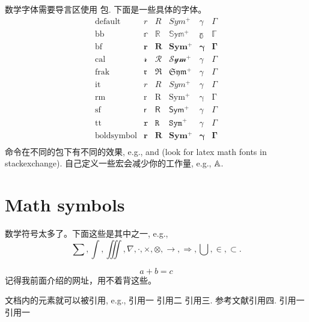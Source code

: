 数学字体需要导言区使用 包. 下面是一些具体的字体。
\[
	\begin{array}{lccccc}
	\text{default} & r & R & Sym^+ & \gamma & \Gamma \\
	\text{bb} & \mathbb{r} & \mathbb{R} & \mathbb{Sym^+} & \mathbb{\gamma}& \mathbb{\Gamma} \\ 
	\text{bf} & \mathbf{r} & \mathbf{R} & \mathbf{Sym^+} & \mathbf{\gamma}& \mathbf{\Gamma} \\
	\text{cal} & \mathcal{r} & \mathcal{R} & \mathcal{Sym^+} & \mathcal{\gamma}& \mathcal{\Gamma} \\
	\text{frak} & \mathfrak{r} & \mathfrak{R} & \mathfrak{Sym^+} & \mathfrak{\gamma}& \mathfrak{\Gamma} \\
	\text{it} & \mathit{r} & \mathit{R} & \mathit{Sym^+} & \mathit{\gamma}& \mathit{\Gamma} \\
	\text{rm} & \mathrm{r} & \mathrm{R} & \mathrm{Sym^+} & \mathrm{\gamma}& \mathrm{\Gamma} \\
	\text{sf} & \mathsf{r} & \mathsf{R} & \mathsf{Sym^+} & \mathsf{\gamma}& \mathsf{\Gamma} \\
	\text{tt} & \mathtt{r} & \mathtt{R} & \mathtt{Sym^+} & \mathtt{\gamma}& \mathtt{\Gamma} \\
	\text{boldsymbol} & \boldsymbol{r} & \boldsymbol{R} & \boldsymbol{Sym^+} & \boldsymbol{\gamma}& \boldsymbol{\Gamma} \\
	\end{array}
\]
命令在不同的包下有不同的效果, e.g.,  and  (look for latex math fonts in stackexchange). 
自己定义一些宏会减少你的工作量, e.g., $\mathbb{A}$.


\section{Math symbols}
\label{math_msymb}

数学符号太多了。下面这些是其中之一, e.g., 
\begin{equation}
	\sum , \int , \iiint , \nabla , \cdot , \times , \otimes , \rightarrow , \Rightarrow , \bigcup , \in , \subset .
\end{equation}

$$
 a + b = c
$$
记得我前面介绍的网址，用不着背这些。

文档内的元素就可以被引用, e.g., 
引用一\citep{Li2005} 
引用二 \citep{Kroner1977}
引用三\citep{Sundararaghavan2007}.
参考文献引用四.
引用一\citep{王世强著-586}
引用一\citep{张禾瑞著-585}



